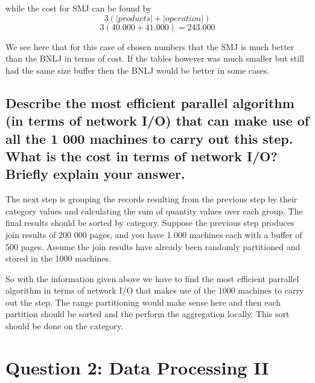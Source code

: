 \documentclass{article}
\begin{document}
while the cost for SMJ can be found by 
$$3(|products|+|operation|)$$
$$3(40.000+41.000)=243.000$$

We see here that for this case of chosen numbers that the SMJ is much better than the BNLJ in terms of cost. If the tables however was much smaller but still had the same size buffer then the BNLJ would be better in some cases. 


\subsection{Describe the most efficient parallel algorithm (in terms of network I/O) that can make use of all the 1 000 machines to carry out this step. What is the cost in terms of network I/O? Briefly explain your answer.}
The next step is grouping the records resulting from the previous step by their category values and calculating the sum of quantity values over each group. The final results should be sorted by category. Suppose the previous step produces join results of 200 000 pages, and you have 1 000 machines each with a buffer of 500 pages. Assume the join results have already been randomly partitioned and stored in the 1000 machines.


So with the information given above we have to find the most efficient parrallel algorithm in terms of network I/O that makes use of the 1000 machines to carry out the step. The range partitioning would make sense here and then each partition should be sorted and the perform the aggregation locally. This sort should be done on the category. 


\section{Question 2: Data Processing II}
\end{document}
